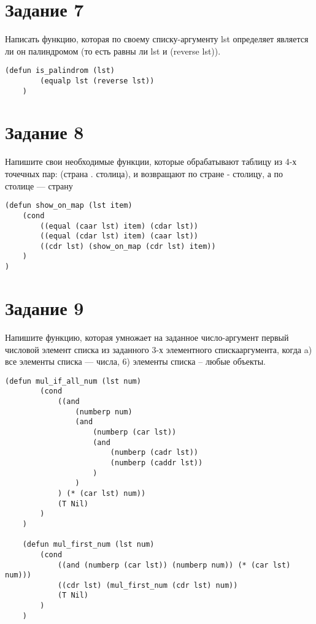 \section{Задание 7}
Написать функцию, которая по своему списку-аргументу lst определяет
является ли он палиндромом (то есть равны ли lst и (reverse lst)).
\begin{center}	
	\begin{lstlisting}[label=g, caption={Выражение 7}]
	(defun is_palindrom (lst)
		(equalp lst (reverse lst))
	)
	\end{lstlisting}
\end{center}

\section{Задание 8}
Напишите свои необходимые функции, которые обрабатывают таблицу из
4-х точечных пар:
(страна . столица), и возвращают по стране - столицу, а по столице —
страну
\begin{center}	
	\begin{lstlisting}[label=h, caption={Выражение 8}]
(defun show_on_map (lst item)
    (cond
        ((equal (caar lst) item) (cdar lst))
        ((equal (cdar lst) item) (caar lst))
        ((cdr lst) (show_on_map (cdr lst) item))
    )
)
	\end{lstlisting}
\end{center}

\section{Задание 9}
Напишите функцию, которая умножает на заданное число-аргумент
первый числовой элемент списка из заданного 3-х элементного спискааргумента, когда
a) все элементы списка --- числа,
6) элементы списка -- любые объекты.
\begin{center}	
	\begin{lstlisting}[label=i, caption={Выражение 9}]
		(defun mul_if_all_num (lst num)
		(cond
			((and
				(numberp num)
				(and
					(numberp (car lst))
					(and
						(numberp (cadr lst))
						(numberp (caddr lst))
					)
				)
			) (* (car lst) num))
			(T Nil)
		)
	)
	
	(defun mul_first_num (lst num)
		(cond
			((and (numberp (car lst)) (numberp num)) (* (car lst) num)))
			((cdr lst) (mul_first_num (cdr lst) num))
			(T Nil)
		)
	)
	\end{lstlisting}
\end{center}

